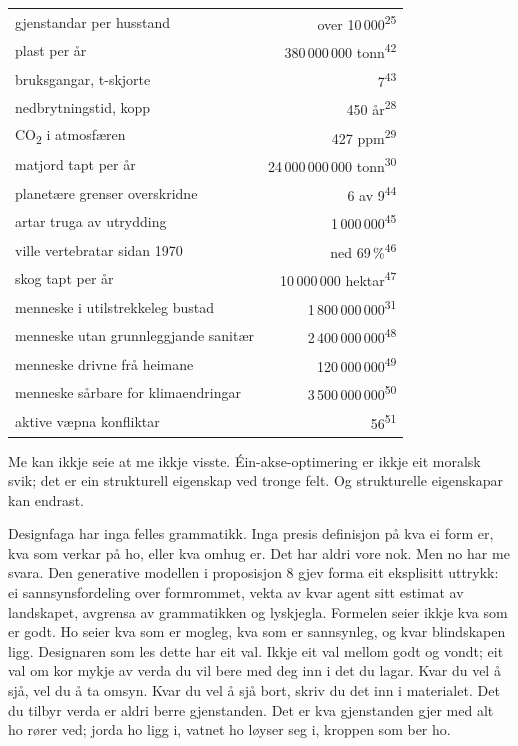 \begin{widebody}
{\bigskip
\begin{center}
\footnotesize
\renewcommand{\arraystretch}{1.15}
\begin{tabular}{@{}p{46mm}r@{}}
\toprule
gjenstandar per husstand & over 10\,000\textsuperscript{25} \\
plast per år & 380\,000\,000 tonn\textsuperscript{42} \\
bruksgangar, t-skjorte & 7\textsuperscript{43} \\
nedbrytningstid, kopp & 450 år\textsuperscript{28} \\
CO\textsubscript{2} i atmosfæren & 427 ppm\textsuperscript{29} \\
matjord tapt per år & 24\,000\,000\,000 tonn\textsuperscript{30} \\
planetære grenser overskridne & 6 av 9\textsuperscript{44} \\
artar truga av utrydding & 1\,000\,000\textsuperscript{45} \\
ville vertebratar sidan 1970 & ned 69\,\%\textsuperscript{46} \\
skog tapt per år & 10\,000\,000 hektar\textsuperscript{47} \\
menneske i utilstrekkeleg bustad & 1\,800\,000\,000\textsuperscript{31} \\
menneske utan grunnleggjande sanitær & 2\,400\,000\,000\textsuperscript{48} \\
menneske drivne frå heimane & 120\,000\,000\textsuperscript{49} \\
menneske sårbare for klimaendringar & 3\,500\,000\,000\textsuperscript{50} \\
aktive væpna konfliktar & 56\textsuperscript{51} \\
\bottomrule
\end{tabular}
\end{center}
\bigskip

Me kan ikkje seie at me ikkje visste. Éin-akse-optimering er ikkje eit moralsk svik; det er ein strukturell eigenskap ved tronge felt. Og strukturelle eigenskapar kan endrast.

Designfaga har inga felles grammatikk. Inga presis definisjon på kva ei form er, kva som verkar på ho, eller kva omhug er. Det har aldri vore nok. Men no har me svara. Den generative modellen i proposisjon 8 gjev forma eit eksplisitt uttrykk: ei sannsynsfordeling over formrommet, vekta av kvar agent sitt estimat av landskapet, avgrensa av grammatikken og lyskjegla. Formelen seier ikkje kva som er godt. Ho seier kva som er mogleg, kva som er sannsynleg, og kvar blindskapen ligg. Designaren som les dette har eit val. Ikkje eit val mellom godt og vondt; eit val om kor mykje av verda du vil bere med deg inn i det du lagar. Kvar du vel å sjå, vel du å ta omsyn. Kvar du vel å sjå bort, skriv du det inn i materialet. Det du tilbyr verda er aldri berre gjenstanden. Det er kva gjenstanden gjer med alt ho rører ved; jorda ho ligg i, vatnet ho løyser seg i, kroppen som ber ho.

}
\end{widebody}
